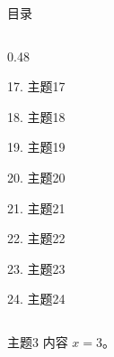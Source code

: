 \documentclass[aspectratio=169,10pt,fontset=fandol]{ctexbeamer}
\begin{document}
\begin{frame}[t,fragile]{目录}
\begin{columns}[T,onlytextwidth]
\begin{column}{0.48\textwidth}
{\color{gray!40}\small 17. 主题17\par}\vspace{0.22em}
{\color{gray!40}\small 18. 主题18\par}\vspace{0.22em}
{\color{gray!40}\small 19. 主题19\par}\vspace{0.22em}
{\color{gray!40}\small 20. 主题20\par}\vspace{0.22em}
{\color{gray!40}\small 21. 主题21\par}\vspace{0.22em}
{\color{gray!40}\small 22. 主题22\par}\vspace{0.22em}
{\color{gray!40}\small 23. 主题23\par}\vspace{0.22em}
{\color{gray!40}\small 24. 主题24\par}\vspace{0.22em}
\end{column}
\end{columns}
\end{frame}
\begin{frame}[t,fragile]{主题3}
\normalsize
{\normalsize
内容 $x=3$。
}
\end{frame}
\end{document}

